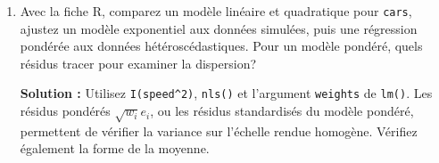 \documentclass[letterpaper,11pt]{article}
\newcommand{\var}{\operatorname{Var}}
\newcommand{\bo}[1]{\bm{#1}}
\newcommand{\prof}[1]{\ifdefined\avecsolutions\par{\color{blue}\textbf{Solution :} #1}\par\fi}
\begin{document}
\begin{enumerate}[leftmargin=*,wide,label=\bfseries Exercice \arabic*:]
\prof{$\var(\varepsilon_t)=4/(1-0{,}36)=6{,}25$; les covariances valent $3{,}75$ et $2{,}25$. La covariance n'est pas $\sigma^2\bo I$, alors que les erreurs-types usuelles reposent sur cette forme. Il faut modéliser la covariance ou utiliser une méthode d'inférence appropriée.}
\item Avec la fiche R, comparez un modèle linéaire et quadratique pour \texttt{cars}, ajustez un modèle exponentiel aux données simulées, puis une régression pondérée aux données hétéroscédastiques. Pour un modèle pondéré, quels résidus tracer pour examiner la dispersion?
\prof{Utilisez \texttt{I(speed\string^2)}, \texttt{nls()} et l'argument \texttt{weights} de \texttt{lm()}. Les résidus pondérés $\sqrt{w_i}e_i$, ou les résidus standardisés du modèle pondéré, permettent de vérifier la variance sur l'échelle rendue homogène. Vérifiez également la forme de la moyenne.}
\end{enumerate}
\end{document}

